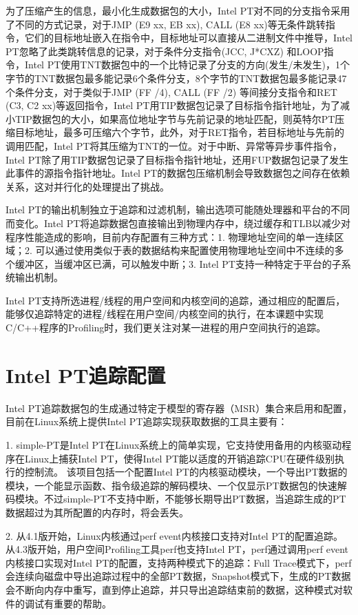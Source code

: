 为了压缩产生的信息，最小化生成数据包的大小，Intel PT对不同的分支指令采用了不同的方式记录，对于JMP (E9 xx, EB xx), CALL (E8 xx)等无条件跳转指令，它们的目标地址嵌入在指令中，目标地址可以直接从二进制文件中推导，Intel PT忽略了此类跳转信息的记录，对于条件分支指令(JCC, J*CXZ) 和LOOP指令，Intel PT使用TNT数据包中的一个比特记录了分支的方向(发生/未发生)，1个字节的TNT数据包最多能记录6个条件分支，8个字节的TNT数据包最多能记录47个条件分支，对于类似于JMP (FF /4), CALL (FF /2) 等间接分支指令和RET (C3, C2 xx)等返回指令，Intel PT用TIP数据包记录了目标指令指针地址，为了减小TIP数据包的大小，如果高位地址字节与先前记录的地址匹配，则英特尔PT压缩目标地址，最多可压缩六个字节，此外，对于RET指令，若目标地址与先前的调用匹配，Intel PT将其压缩为TNT的一位。对于中断、异常等异步事件指令，Intel PT除了用TIP数据包记录了目标指令指针地址，还用FUP数据包记录了发生此事件的源指令指针地址。Intel PT的数据包压缩机制会导致数据包之间存在依赖关系，这对并行化的处理提出了挑战。

Intel PT的输出机制独立于追踪和过滤机制，输出选项可能随处理器和平台的不同而变化。Intel PT将追踪数据包直接输出到物理内存中，绕过缓存和TLB以减少对程序性能造成的影响，目前内存配置有三种方式：1. 物理地址空间的单一连续区域；2. 可以通过使用类似于表的数据结构来配置使用物理地址空间中不连续的多个缓冲区，当缓冲区已满，可以触发中断；3. Intel PT支持一种特定于平台的子系统输出机制。

Intel PT支持所选进程/线程的用户空间和内核空间的追踪，通过相应的配置后，能够仅追踪特定的进程/线程在用户空间/内核空间的执行，在本课题中实现C/C++程序的Profiling时，我们更关注对某一进程的用户空间执行的追踪。

\section{{Intel PT追踪配置}}
Intel PT追踪数据包的生成通过特定于模型的寄存器（MSR）集合来启用和配置，目前在Linux系统上提供Intel PT追踪实现获取数据的工具主要有：

1. simple-PT是Intel PT在Linux系统上的简单实现，它支持使用备用的内核驱动程序在Linux上捕获Intel PT，使得Intel PT能以适度的开销追踪CPU在硬件级别执行的控制流。 该项目包括一个配置Intel PT的内核驱动模块，一个导出PT数据的模块，一个能显示函数、指令级追踪的解码模块、一个仅显示PT数据包的快速解码模块。不过simple-PT不支持中断，不能够长期导出PT数据，当追踪生成的PT数据超过为其所配置的内存时，将会丢失。

2. 从4.1版开始，Linux内核通过perf event内核接口支持对Intel PT的配置追踪。 从4.3版开始，用户空间Profiling工具perf也支持Intel PT，perf通过调用perf event内核接口实现对Intel PT的配置，支持两种模式下的追踪：Full Trace模式下，perf会连续向磁盘中导出追踪过程中的全部PT数据，Snapshot模式下，生成的PT数据会不断向内存中重写，直到停止追踪，并只导出追踪结束前的数据，这种模式对软件的调试有重要的帮助。

